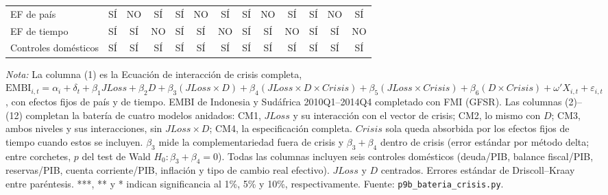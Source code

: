 \documentclass[11pt]{article}
\begin{document}
\begin{landscape}
\begin{table}
\begin{tabular}{l c ccc ccc ccc cc}
\midrule
EF de país & SÍ & NO & SÍ & SÍ & NO & SÍ & SÍ & NO & SÍ & SÍ & NO & SÍ \\
EF de tiempo & SÍ & SÍ & NO & SÍ & SÍ & NO & SÍ & SÍ & NO & SÍ & SÍ & NO \\
Controles domésticos & SÍ & SÍ & SÍ & SÍ & SÍ & SÍ & SÍ & SÍ & SÍ & SÍ & SÍ & SÍ \\
\bottomrule
\end{tabular}
\par\smallskip\parbox{\linewidth}{\scriptsize \textit{Nota:} La columna (1) es la Ecuación de interacción de crisis completa, $\mathrm{EMBI}_{i,t}=\alpha_i+\delta_t+\beta_1 JLoss+\beta_2 D+\beta_3(JLoss\times D)+\beta_4(JLoss\times D\times Crisis)+\beta_5(JLoss\times Crisis)+\beta_6(D\times Crisis)+\omega'X_{i,t}+\varepsilon_{i,t}$, con efectos fijos de país y de tiempo. EMBI de Indonesia y Sudáfrica 2010Q1--2014Q4 completado con FMI (GFSR). Las columnas (2)--(12) completan la batería de cuatro modelos anidados: CM1, $JLoss$ y su interacción con el vector de crisis; CM2, lo mismo con $D$; CM3, ambos niveles y sus interacciones, sin $JLoss\times D$; CM4, la especificación completa. $Crisis$ sola queda absorbida por los efectos fijos de tiempo cuando estos se incluyen. $\beta_3$ mide la complementariedad fuera de crisis y $\beta_3+\beta_4$ dentro de crisis (error estándar por método delta; entre corchetes, $p$ del test de Wald $H_0\!:\beta_3+\beta_4=0$). Todas las columnas incluyen seis controles domésticos (deuda/PIB, balance fiscal/PIB, reservas/PIB, cuenta corriente/PIB, inflación y tipo de cambio real efectivo). $JLoss$ y $D$ centrados. Errores estándar de Driscoll--Kraay entre paréntesis. ***, ** y * indican significancia al 1\%, 5\% y 10\%, respectivamente. Fuente: \texttt{p9b\_bateria\_crisis.py}.}
\end{table}
\end{landscape}
\end{document}
